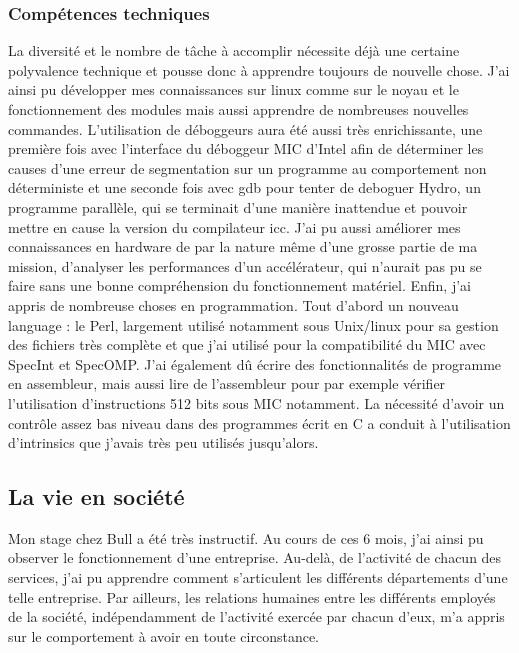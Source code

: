 \documentclass[11pt]{article}
\begin{document}
			\subsubsection{Compétences techniques}
			La diversité et le nombre de tâche à accomplir nécessite déjà une certaine polyvalence technique et pousse donc à 
			apprendre toujours de nouvelle chose. J'ai ainsi pu développer mes connaissances sur linux comme sur le noyau et 
			le fonctionnement des modules mais aussi apprendre de nombreuses nouvelles commandes. \newline
			L'utilisation de déboggeurs aura été aussi très enrichissante, une première fois avec l'interface du déboggeur 
			MIC d'Intel afin de déterminer les causes d'une erreur de segmentation sur un programme au comportement non 
			déterministe et une seconde fois avec gdb pour tenter de deboguer Hydro, un programme parallèle, qui se terminait 
			d'une manière inattendue et pouvoir mettre en cause la version du compilateur icc. \newline
			J'ai pu aussi améliorer mes connaissances en hardware de par la nature même d'une grosse partie de ma mission, d'analyser 
			les performances d'un accélérateur, qui n'aurait pas pu se faire sans une bonne compréhension du fonctionnement matériel. \newline
			Enfin, j'ai appris de nombreuse choses en programmation. Tout d'abord un nouveau language : le Perl, largement utilisé 
			notamment sous Unix/linux pour sa gestion des fichiers très complète et que j'ai utilisé pour la compatibilité du MIC 
			avec SpecInt et SpecOMP. J'ai également dû écrire des fonctionnalités de programme en assembleur, mais aussi lire 
			de l'assembleur pour par exemple vérifier l'utilisation d'instructions 512 bits sous MIC notamment. La nécessité 
			d'avoir un contrôle assez bas niveau dans des programmes écrit en C a conduit à l'utilisation d'intrinsics que j'avais 
			très peu utilisés jusqu'alors.
		\subsection{La vie en société}
		Mon stage chez Bull a été très instructif. Au cours de ces 6 mois, j’ai ainsi pu observer le fonctionnement 
		d’une entreprise. Au-delà, de l’activité de chacun des services, j’ai pu apprendre comment s’articulent les différents 
		départements d’une telle entreprise. Par ailleurs, les relations humaines entre les différents employés de la 
		société, indépendamment de l’activité exercée par chacun d’eux, m’a appris sur le comportement à avoir en toute 
		circonstance.
\newpage
{}
\end{document}
